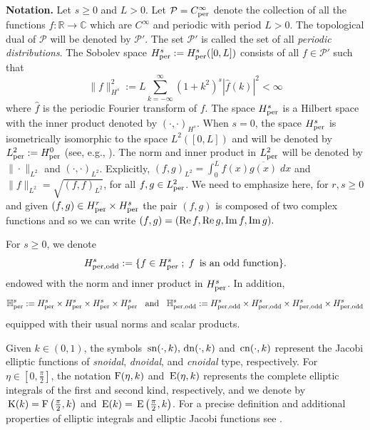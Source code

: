 \documentclass[10pt,reqno,a4paper]{amsart} %
\theoremstyle{definition} %
\newcommand{\cn}{{\rm \,cn}}
\newcommand{\sn}{{\rm \,sn}}
\newcommand{\dn}{{\rm \,dn}}
\newcommand{\K}{{\rm \,K}}
\newcommand{\E}{{\rm \,E}}
\numberwithin{equation}{section}
\numberwithin{figure}{section}
\begin{document}
\noindent \textbf{Notation.} Let $s\geq0$ and $L>0$. Let $\mathcal{P} = C^\infty_{\rm per}$ denote the collection of all the functions $f : \mathbb{R} \to \mathbb{C}$ which are $C^\infty$ and periodic with period $L > 0$. The topological dual of $\mathcal{P}$ will be denoted by $\mathcal{P}'$. The set $\mathcal{P}'$ is called the set of all \textit{periodic distributions}. The Sobolev space
$H^s_{\rm per}:=H^s_{\rm per}([0,L])$ consists of all  $f \in \mathcal{P}'$ such that
$$
\|f\|^2_{H^s}:= L \sum_{k=-\infty}^{\infty}(1+k^2)^s|\widehat{f}(k)|^2 <\infty
$$
where $\widehat{f}$ is the periodic Fourier transform of $f$. The space $H^s_{\rm per}$ is a  Hilbert space with the inner product denoted by $(\cdot, \cdot)_{H^s}$. When $s=0$, the space $H^s_{\rm per}$ is isometrically isomorphic to the space  $L^2([0,L])$ and will be denoted by $L^2_{\rm per}:=H^0_{\rm per}$ (see, e.g., \cite{Iorio}). The norm and inner product in $L^2_{\rm per}$ will be denoted by $\|\cdot \|_{L^2}$ and $(\cdot, \cdot)_{L^2}$. Explicitly, $(f,g)_{L^2}=\int_0^L f(x) \overline{g(x)}\; dx$ and $\|f\|_{L^2}=\sqrt{(f,f)_{L^2}}$, for all $f, g \in L^2_{\rm per}$.  We need to emphasize here, for $r,s \geq 0$ and given $(f,g) \in H^r_{\rm per} \times H^s_{\rm per}$ the pair $(f,g)$ is composed of two complex functions and so we can write $(f,g)=({\rm Re}\,f, {\rm Re}\,g,{\rm Im}\,f, {\rm Im}\,g).$ 



For $s\geq0$, we denote
$$
H^s_{\rm per,odd}:=\{ f \in H^s_{\rm per} \; ; \; f \:\; \text{is an odd function}\}.
$$
endowed with the norm and inner product in $H^s_{\rm per}$. In addition,
$$
\mathbb{H}^s_{\rm per}:= H^s_{\rm per} \times H^s_{\rm per} \times H^s_{\rm per} \times H^s_{\rm per} \; \; \text{ and } \; \; \mathbb{H}^s_{\rm per,odd}:=H^s_{\rm per,odd} \times H^s_{\rm per,odd} \times H^s_{\rm per,odd} \times H^s_{\rm per,odd}
$$
equipped with their usual norms and scalar products.



Given $k \in (0, 1)$, the symbols $\sn(\cdot, k), \dn(\cdot, k)$ and $\cn(\cdot, k)$ represent the Jacobi elliptic functions of \textit{snoidal}, \textit{dnoidal}, and \textit{cnoidal} type, respectively. For $\eta \in \left[0, \frac{\pi}{2}\right]$, the notation ${\rm F}(\eta, k)$ and $\E(\eta, k)$  represents the complete elliptic integrals of the first and second kind, respectively, and  we denote by $\K(k)={\rm F}\left(\frac{\pi}{2},k\right)$ and $\E(k)=\E\left(\frac{\pi}{2},k\right)$. For a precise definition and additional properties of elliptic integrals and elliptic Jacobi functions see \cite{byrd}.
\end{document}
